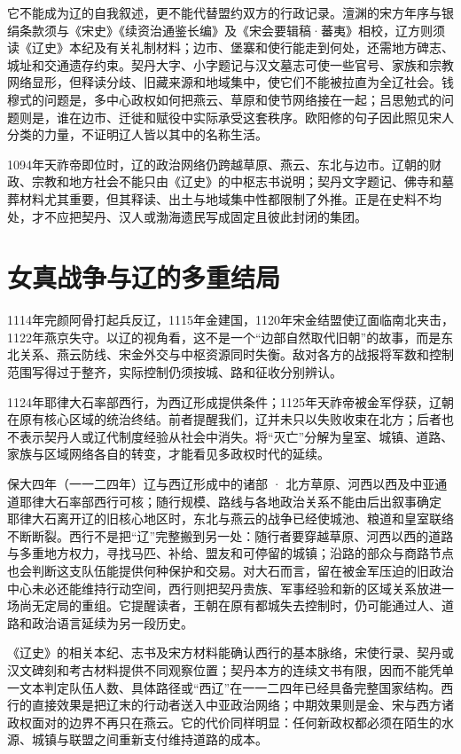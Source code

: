 它不能成为辽的自我叙述，更不能代替盟约双方的行政记录。澶渊的宋方年序与银绢条款须与《宋史》《续资治通鉴长编》及《宋会要辑稿·蕃夷》相校，辽方则须读《辽史》本纪及有关礼制材料；边市、堡寨和使行能走到何处，还需地方碑志、城址和交通遗存约束。契丹大字、小字题记与汉文墓志可使一些官号、家族和宗教网络显形，但释读分歧、旧藏来源和地域集中，使它们不能被拉直为全辽社会。钱穆式的问题是，多中心政权如何把燕云、草原和使节网络接在一起；吕思勉式的问题则是，谁在边市、迁徙和赋役中实际承受这套秩序。欧阳修的句子因此照见宋人分类的力量，不证明辽人皆以其中的名称生活。

1094年天祚帝即位时，辽的政治网络仍跨越草原、燕云、东北与边市。辽朝的财政、宗教和地方社会不能只由《辽史》的中枢志书说明；契丹文字题记、佛寺和墓葬材料尤其重要，但其释读、出土与地域集中性都限制了外推。正是在史料不均处，才不应把契丹、汉人或渤海遗民写成固定且彼此封闭的集团。

\section{女真战争与辽的多重结局}

1114年完颜阿骨打起兵反辽，1115年金建国，1120年宋金结盟使辽面临南北夹击，1122年燕京失守。以辽的视角看，这不是一个“边部自然取代旧朝”的故事，而是东北关系、燕云防线、宋金外交与中枢资源同时失衡。敌对各方的战报将军数和控制范围写得过于整齐，实际控制仍须按城、路和征收分别辨认。

1124年耶律大石率部西行，为西辽形成提供条件；1125年天祚帝被金军俘获，辽朝在原有核心区域的统治终结。前者提醒我们，辽并未只以失败收束在北方；后者也不表示契丹人或辽代制度经验从社会中消失。将“灭亡”分解为皇室、城镇、道路、家族与区域网络各自的转变，才能看见多政权时代的延续。

\begin{event}{}{保大四年（一一二四年）}{辽与西辽形成中的诸部 · 北方草原、河西以西及中亚通道}{耶律大石率部西行可核；随行规模、路线与各地政治关系不能由后出叙事确定}
耶律大石离开辽的旧核心地区时，东北与燕云的战争已经使城池、粮道和皇室联络不断断裂。西行不是把“辽”完整搬到另一处：随行者要穿越草原、河西以西的道路与多重地方权力，寻找马匹、补给、盟友和可停留的城镇；沿路的部众与商路节点也会判断这支队伍能提供何种保护和交易。对大石而言，留在被金军压迫的旧政治中心未必还能维持行动空间，西行则把契丹贵族、军事经验和新的区域关系放进一场尚无定局的重组。它提醒读者，王朝在原有都城失去控制时，仍可能通过人、道路和政治语言延续为另一段历史。

《辽史》的相关本纪、志书及宋方材料能确认西行的基本脉络，宋使行录、契丹或汉文碑刻和考古材料提供不同观察位置；契丹本方的连续文书有限，因而不能凭单一文本判定队伍人数、具体路径或“西辽”在一一二四年已经具备完整国家结构。西行的直接效果是把辽末的行动者送入中亚政治网络；中期效果则是金、宋与西方诸政权面对的边界不再只在燕云。它的代价同样明显：任何新政权都必须在陌生的水源、城镇与联盟之间重新支付维持道路的成本。
\end{event}

